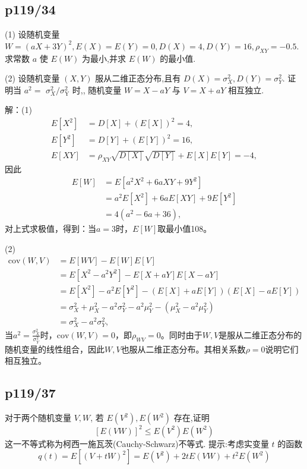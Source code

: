 \documentclass[UTF8,a4paper,10pt]{ctexart}
\begin{document}
\subsection{p119/34}
(1) 设随机变量 $W=(a X+3 Y)^{2}, E(X)=E(Y)=0, D(X)=4, D(Y)=16, \rho_{X Y}=-0.5$.
求常数 $a$ 使 $E(W)$ 为最小,并求 $E(W)$ 的最小值.

(2) 设随机变量 $(X, Y)$ 服从二维正态分布,且有 $D(X)=\sigma_{X}^{2}, D(Y)=\sigma_{Y}^{2} .$ 证明当 $a^{2}=$ $\sigma_{X}^{2} / \sigma_{\mathrm{Y}}^{2}$ 时,, 随机变量 $W=X-a Y$ 与 $V=X+a Y$ 相互独立.

解：(1)
\begin{align}
    E[X^2] &= D[X] + (E[X])^2 = 4, \\
    E[Y^2] &= D[Y] + (E[Y])^2 = 16, \\
    E[XY] &= \rho_{XY}\sqrt{D[X]}\sqrt{D[Y]} + E[X]E[Y] = -4,
\end{align}
因此
\begin{align}
    E[W] &= E[a^2X^2 + 6aXY + 9Y^2] \nonumber \\
         &= a^2E[X^2] + 6aE[XY] + 9E[Y^2] \nonumber \\
         &= 4(a^2 - 6a + 36),
\end{align}
对上式求极值，得到：当$a = 3$时，$E[W]$取最小值108。

(2)
\begin{align}
    \mathrm{cov}(W,V) &= E[WV] - E[W]E[V]  \nonumber \\
                 &= E[X^2 - a^2Y^2] - E[X + aY]E[X - aY] \nonumber \\
                 &= E[X^2] - a^2E[Y^2] - (E[X] + aE[Y])(E[X] - aE[Y]) \nonumber \\
                 &= \sigma_X^2 + \mu_X^2 - a^2\sigma_Y^2 - a^2\mu_Y^2 - (\mu_X^2 - a^2\mu_Y^2) \nonumber \\
                 &= \sigma_X^2 - a^2\sigma_Y^2,
\end{align}
当$a^2 = \displaystyle\frac{\sigma_X^2}{\sigma_Y^2}$时，$\mathrm{cov}(W,V)=0$，即$\rho_{WV} = 0$。同时由于$W,V$是服从二维正态分布的随机变量的线性组合，因此$W,V$也服从二维正态分布。其相关系数$\rho = 0$说明它们相互独立。

\subsection{p119/37}
 对于两个随机变量 $V, W$, 若 $E\left(V^{2}\right), E\left(W^{2}\right)$ 存在,证明
$$
[E(V W)]^{2} \leqslant E\left(V^{2}\right) E\left(W^{2}\right)
$$
这一不等式称为柯西一施瓦茨(Cauchy-Schwarz)不等式.
提示:考虑实变量 $t$ 的函数
$$
q(t)=E\left[(V+t W)^{2}\right]=E\left(V^{2}\right)+2 t E(V W)+t^{2} E\left(W^{2}\right)
$$
\end{document}
